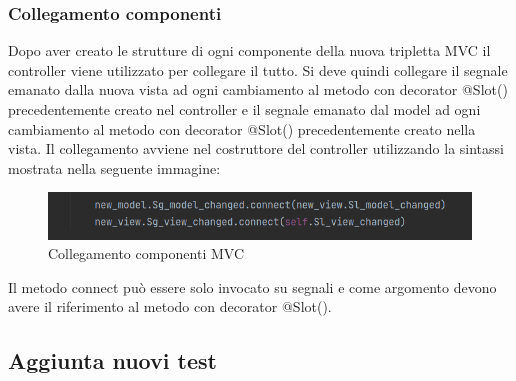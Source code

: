 \subsubsection{Collegamento componenti}
Dopo aver creato le strutture di ogni componente della nuova tripletta MVC il controller viene utilizzato per collegare il tutto. 
Si deve quindi collegare il segnale emanato dalla nuova vista ad ogni cambiamento al metodo con decorator @Slot() precedentemente creato nel controller e il segnale emanato dal model ad ogni cambiamento al metodo con decorator @Slot() precedentemente creato nella vista. Il collegamento avviene nel costruttore del controller utilizzando la sintassi mostrata nella seguente immagine:
\begin{figure}[H]
    \centering
    \includegraphics[scale = 0.50]{components/img/collegamento-segnali-mvc.png}
    \caption{Collegamento componenti MVC}
    \label{fig:Collegamento componenti MVC}
\end{figure}
Il metodo connect può essere solo invocato su segnali e come argomento devono avere il riferimento al metodo con decorator @Slot().

\subsection{Aggiunta nuovi test}
